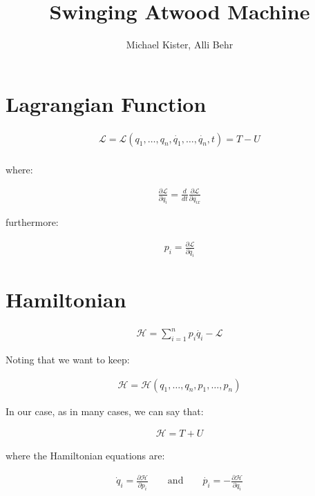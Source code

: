 \documentclass{article}
\title{Swinging Atwood Machine}
\author{Michael Kister, Alli Behr}
\date{}
\begin{document}
\maketitle

\section*{Lagrangian Function}

\begin{gather*}
\mathscr{L} = \mathscr{L}(q_{1}, \ldots, q_{n}, \dot{q_{1}}, \ldots, \dot{q_{n}}, t) = T - U \\
\end{gather*}

where:

\begin{gather*}
\frac{\partial \mathscr{L}}{\partial q_{i}} = \frac{d}{dt}\frac{\partial \mathscr{L}}{\partial \dot{q_{ix}}}
\end{gather*}

furthermore:

\begin{gather*}
p_{i} = \frac{\partial \mathscr{L}}{\partial \dot{q_{i}}}
\end{gather*}

\section*{Hamiltonian}

\begin{gather*}
\mathscr{H} = \sum_{i = 1}^{n}p_{i}\dot{q_{i}} - \mathscr{L}
\end{gather*}

Noting that we want to keep:

\begin{gather*}
\mathscr{H} = \mathscr{H}(q_{1}, \ldots, q_{n}, p_{1}, \ldots, p_{n})
\end{gather*}

In our case, as in many cases, we can say that:

\begin{gather*}
\mathscr{H} = T + U
\end{gather*}

where the Hamiltonian equations are:

\begin{gather*}
\dot{q}_{i} = \frac{\partial \mathscr{H}}{\partial p_{i}} \qquad\text{and}\qquad \dot{p_{i}} = - \frac{\partial \mathscr{H}}{\partial q_{i}}
\end{gather*}
\end{document}
